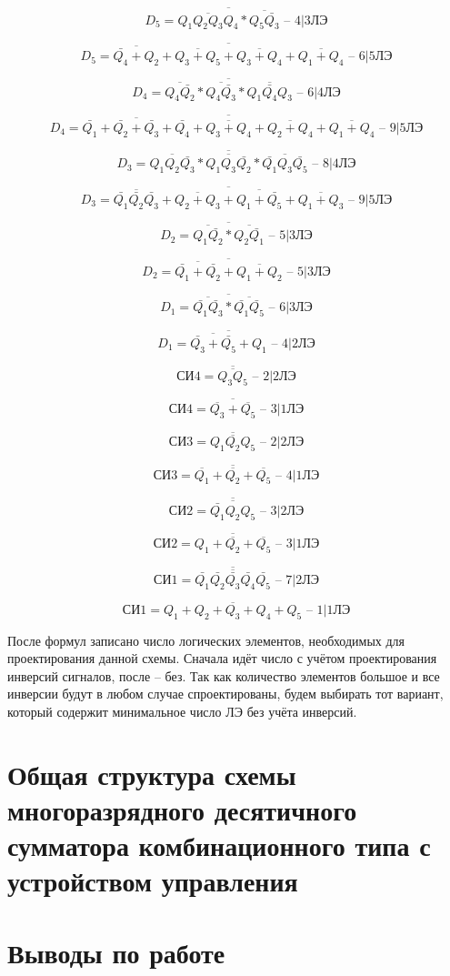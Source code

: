 \documentclass[a4paper,14pt]{article}
\begin{document}
$$ D_5 =\overline{\overline{Q_1 Q_2 Q_3 Q_4} * \overline{Q_5 \bar{Q_3}}} \text{ -- 4|3ЛЭ} $$

$$ D_5 =\overline{\overline{\bar{Q_4} + Q_2 } + \overline{Q_3 + Q_5} + \overline{Q_3 + Q_4} + \overline{Q_1 + Q_4}} \text{ -- 6|5ЛЭ} $$

$$ D_4 =\overline{\overline{Q_4 \bar{Q_2}} * \overline{Q_4 \bar{Q_3}} * \overline{Q_1 \bar{Q_4} Q_3 } } \text{ -- 6|4ЛЭ} $$

$$ D_4 =\overline{\overline{\bar{Q_1} + \bar{Q_2} + \bar{Q_3} + \bar{Q_4}} + \overline{Q_3 + Q_4} + \overline{Q_2 + Q_4} + \overline{{Q_1 + Q_4}}} \text{ -- 9|5ЛЭ} $$

$$ D_3 =\overline{\overline{Q_1 Q_2 \bar{Q_3}} * \overline{Q_1 Q_3 \bar{Q_2}} * \overline{\bar{Q_1} Q_3 \bar{Q_5}}} \text{ -- 8|4ЛЭ} $$

$$ D_3 =\overline{\overline{\bar{Q_1} \bar{Q_2} \bar{Q_3}} + \overline{Q_2 + Q_3} + \overline{Q_1 + \bar{Q_5}} + \overline{Q_1 + Q_3}} \text{ -- 9|5ЛЭ} $$

$$ D_2 =\overline{\overline{Q_1  \bar{Q_2}} * \overline{Q_2  \bar{Q_1}}} \text{ -- 5|3ЛЭ} $$

$$ D_2 =\overline{\overline{\bar{Q_1} + \bar{Q_2}} + \overline{Q_1 + Q_2}} \text{ -- 5|3ЛЭ} $$

$$ D_1 =\overline{\overline{\bar{Q_1}  \bar{Q_3}} * \overline{\bar{Q_1}  \bar{Q_5}}} \text{ -- 6|3ЛЭ} $$

$$ D_1 =\overline{\overline{\bar{Q_3} + \bar{Q_5}} + Q_1} \text{ -- 4|2ЛЭ} $$

$$ \text{СИ4} =\overline{\overline{Q_3Q_5}} \text{ -- 2|2ЛЭ} $$

$$ \text{СИ4} =\overline{\overline{Q_3} + \overline{Q_5}} \text{ -- 3|1ЛЭ} $$

$$ \text{СИ3} =\overline{\overline{Q_1Q_2Q_5}} \text{ -- 2|2ЛЭ} $$

$$ \text{СИ3} =\overline{\overline{Q_1} + \overline{Q_2} + \overline{Q_5}} \text{ -- 4|1ЛЭ} $$

$$ \text{СИ2} =\overline{\overline{\bar{Q_1}Q_2Q_5}} \text{ -- 3|2ЛЭ} $$

$$ \text{СИ2} =\overline{Q_1 + \overline{Q_2} + \overline{Q_5}} \text{ -- 3|1ЛЭ} $$

$$ \text{СИ1} =\overline{\overline{\bar{Q_1}\bar{Q_2}\bar{Q_3}\bar{Q_4}\bar{Q_5}}} \text{ -- 7|2ЛЭ} $$

$$ \text{СИ1} =\overline{Q_1 + Q_2 + Q_3 + Q_4 + Q_5} \text{ -- 1|1ЛЭ} $$

После формул записано число логических элементов, необходимых для проектирования данной схемы.
Сначала идёт число с учётом проектирования инверсий сигналов, после -- без.
Так как количество элементов большое и все инверсии будут в любом случае спроектированы, будем выбирать тот вариант, который содержит минимальное число ЛЭ без учёта инверсий.


\section{Общая структура схемы многоразрядного десятичного сумматора комбинационного типа с устройством управления}

\section{Выводы по работе}
\end{document}

